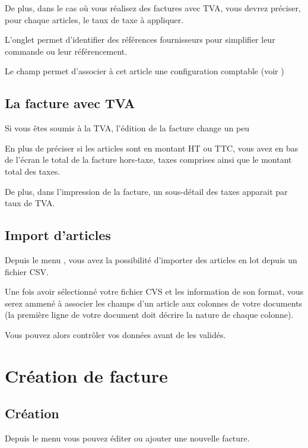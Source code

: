 \documentclass[a4paper,10pt,oneside,french]{sphinxmanual}
\begin{document}
De plus, dans le cas où vous réalisez des factures avec TVA, vous devrez préciser, pour chaque articles, le taux de taxe à appliquer.

L’onglet  permet d’identifier des références fournisseurs pour simplifier leur commande ou leur référencement.

Le champ  permet d’associer à cet article une configuration comptable (voir )


\subsection{La facture avec TVA}
\label{\detokenize{invoice/articles:la-facture-avec-tva}}
Si vous êtes soumis à la TVA, l’édition de la facture change un peu

En plus de préciser si les articles sont en montant HT ou TTC, vous avez en bas de l’écran le total de la facture hors-taxe, taxes comprises ainsi que le montant total des taxes.

De plus, dans l’impression de la facture, un sous-détail des taxes apparait par taux de TVA.


\subsection{Import d’articles}
\label{\detokenize{invoice/articles:import-d-articles}}
Depuis le menu , vous avez la possibilité d’importer des articles en lot depuis un fichier CSV.

Une fois avoir sélectionné votre fichier CVS et les information de son format,
vous serez ammené à associer les champs d’un article aux colonnes de votre documents (la première ligne de votre document doit décrire la nature de chaque colonne).

Vous pouvez alors contrôler vos données avant de les validés.


\section{Création de facture}
\label{\detokenize{invoice/create_bill:creation-de-facture}}\label{\detokenize{invoice/create_bill::doc}}

\subsection{Création}
\label{\detokenize{invoice/create_bill:creation}}
Depuis le menu  vous pouvez éditer ou ajouter une nouvelle facture.
\end{document}
